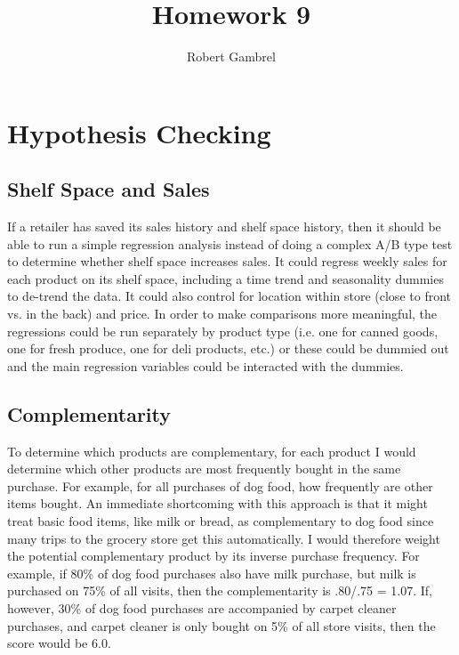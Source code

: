 \documentclass[]{article}
\title{Homework 9}
\author{Robert Gambrel}
\begin{document}
\maketitle


\section{Hypothesis Checking}
\begin{large}
	
\subsection{Shelf Space and Sales}

If a retailer has saved its sales history and shelf space history, then it should be able to run a simple regression analysis instead of doing a complex A/B type test to determine whether shelf space increases sales. It could regress weekly sales for each product on its shelf space, including a time trend and seasonality dummies to de-trend the data. It could also control for location within store (close to front vs. in the back) and price. In order to make comparisons more meaningful, the regressions could be run separately by product type (i.e. one for canned goods, one for fresh produce, one for deli products, etc.) or these could be dummied out and the main regression variables could be interacted with the dummies. 

\subsection{Complementarity}

To determine which products are complementary, for each product I would determine which other products are most frequently bought in the same purchase. For example, for all purchases of dog food, how frequently are other items bought. An immediate shortcoming with this approach is that it might treat basic food items, like milk or bread, as complementary to dog food since many trips to the grocery store get this automatically. I would therefore weight the potential complementary product by its inverse purchase frequency. For example, if 80\% of dog food purchases also have milk purchase, but milk is purchased on 75\% of all visits, then the complementarity is .80/.75 = 1.07. If, however, 30\% of dog food purchases are accompanied by carpet cleaner purchases, and carpet cleaner is only bought on 5\% of all store visits, then the score would be 6.0. 


\end{large}
\end{document}

